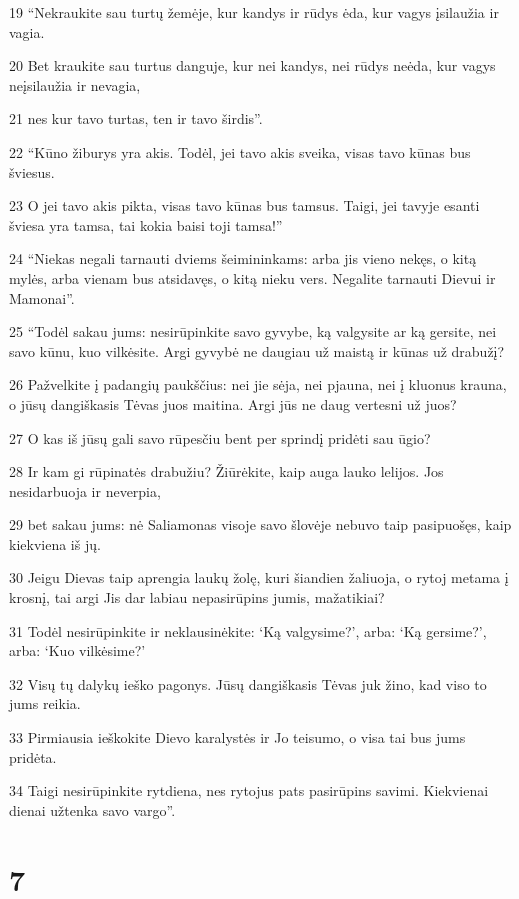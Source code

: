 \par 19 “Nekraukite sau turtų žemėje, kur kandys ir rūdys ėda, kur vagys įsilaužia ir vagia. 
\par 20 Bet kraukite sau turtus danguje, kur nei kandys, nei rūdys neėda, kur vagys neįsilaužia ir nevagia, 
\par 21 nes kur tavo turtas, ten ir tavo širdis”. 
\par 22 “Kūno žiburys yra akis. Todėl, jei tavo akis sveika, visas tavo kūnas bus šviesus. 
\par 23 O jei tavo akis pikta, visas tavo kūnas bus tamsus. Taigi, jei tavyje esanti šviesa yra tamsa, tai kokia baisi toji tamsa!” 
\par 24 “Niekas negali tarnauti dviems šeimininkams: arba jis vieno nekęs, o kitą mylės, arba vienam bus atsidavęs, o kitą nieku vers. Negalite tarnauti Dievui ir Mamonai”. 
\par 25 “Todėl sakau jums: nesirūpinkite savo gyvybe, ką valgysite ar ką gersite, nei savo kūnu, kuo vilkėsite. Argi gyvybė ne daugiau už maistą ir kūnas už drabužį? 
\par 26 Pažvelkite į padangių paukščius: nei jie sėja, nei pjauna, nei į kluonus krauna, o jūsų dangiškasis Tėvas juos maitina. Argi jūs ne daug vertesni už juos? 
\par 27 O kas iš jūsų gali savo rūpesčiu bent per sprindį pridėti sau ūgio? 
\par 28 Ir kam gi rūpinatės drabužiu? Žiūrėkite, kaip auga lauko lelijos. Jos nesidarbuoja ir neverpia, 
\par 29 bet sakau jums: nė Saliamonas visoje savo šlovėje nebuvo taip pasipuošęs, kaip kiekviena iš jų. 
\par 30 Jeigu Dievas taip aprengia laukų žolę, kuri šiandien žaliuoja, o rytoj metama į krosnį, tai argi Jis dar labiau nepasirūpins jumis, mažatikiai? 
\par 31 Todėl nesirūpinkite ir neklausinėkite: ‘Ką valgysime?’, arba: ‘Ką gersime?’, arba: ‘Kuo vilkėsime?’ 
\par 32 Visų tų dalykų ieško pagonys. Jūsų dangiškasis Tėvas juk žino, kad viso to jums reikia. 
\par 33 Pirmiausia ieškokite Dievo karalystės ir Jo teisumo, o visa tai bus jums pridėta. 
\par 34 Taigi nesirūpinkite rytdiena, nes rytojus pats pasirūpins savimi. Kiekvienai dienai užtenka savo vargo”.



\chapter{7}


